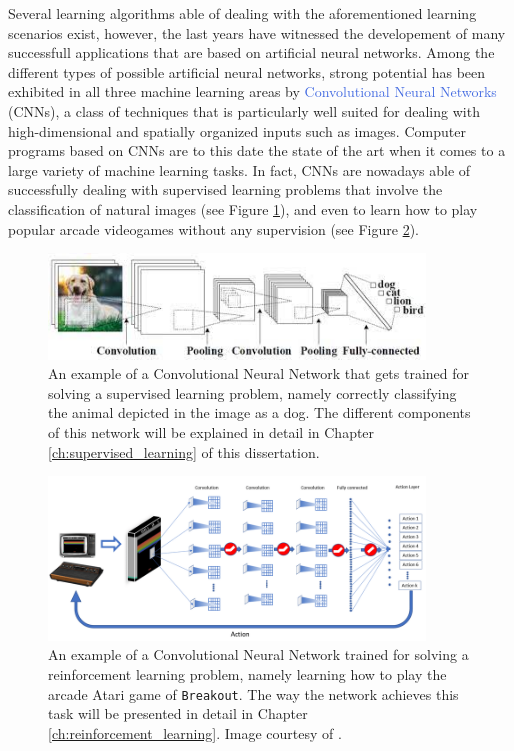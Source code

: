 Several learning algorithms able of dealing with the aforementioned learning scenarios exist, however, the last years have witnessed the developement of many successfull applications that are based on artificial neural networks. Among the different types of possible artificial neural networks, strong potential has been exhibited in all three machine learning areas by \textcolor{RoyalBlue}{Convolutional Neural Networks} (CNNs), a class of techniques that is particularly well suited for dealing with high-dimensional and spatially organized inputs such as images. Computer programs based on CNNs are to this date the state of the art when it comes to a large variety of machine learning tasks. In fact, CNNs are nowadays able of successfully dealing with supervised learning problems that involve the classification of natural images (see Figure \ref{fig:dogo}), and even to learn how to play popular arcade videogames without any supervision (see Figure \ref{fig:dqn_example}).

\begin{figure}[ht!]
\centering
  \includegraphics[width=10cm]{./Images/Chapter00/dogo}
  \caption{An example of a Convolutional Neural Network that gets trained for solving a supervised learning problem, namely correctly classifying the animal depicted in the image as a dog. The different components of this network will be explained in detail in Chapter \ref{ch:supervised_learning} of this dissertation.}
  \label{fig:dogo}
\end{figure}

\begin{figure}[ht!]
\centering
  \includegraphics[width=10cm]{./Images/Chapter00/dqn}
  \caption{An example of a Convolutional Neural Network trained for solving a reinforcement learning problem, namely learning how to play the arcade Atari game of \texttt{Breakout}. The way the network achieves this task will be presented in detail in Chapter \ref{ch:reinforcement_learning}. Image courtesy of \citet{patel2019improved}.}
  \label{fig:dqn_example}
\end{figure}




